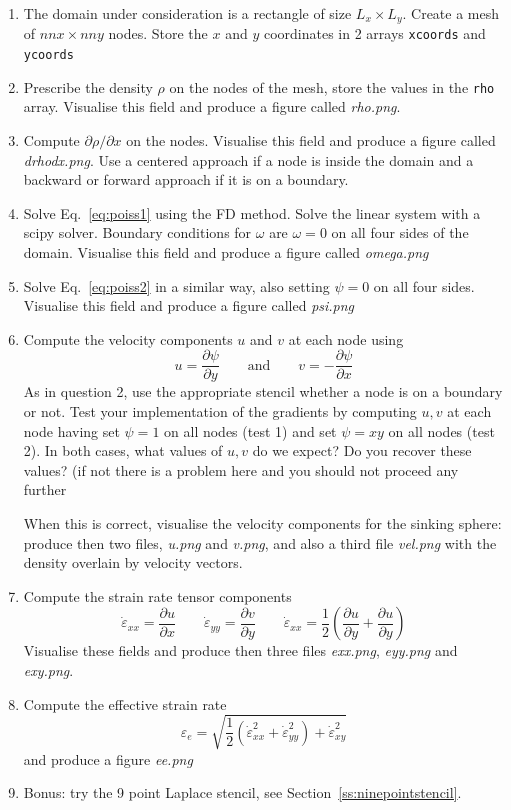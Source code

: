 \begin{enumerate}
\item The domain under consideration is a rectangle of size $L_x \times L_y$. Create a mesh of $nnx \times nny$ nodes. 
Store the $x$ and $y$ coordinates in 2 arrays {\tt xcoords} and {\tt ycoords}
\item Prescribe the density $\rho$ on the nodes of the mesh, store the values in the {\tt rho} array. 
Visualise this field and produce a figure called {\sl rho.png}.
\item Compute $\partial \rho/ \partial x$ on the nodes. Visualise this field and produce a figure called {\sl drhodx.png}. 
Use a centered approach if a node is inside the domain and a backward or forward approach if it is on a boundary.
\item Solve Eq.~\eqref{eq:poiss1} using the FD method. Solve the linear system with a scipy solver. Boundary conditions for $\omega$ are $\omega=0$ on all four sides of the domain.
Visualise this field and produce a figure called {\sl omega.png}
\item Solve Eq.~\eqref{eq:poiss2} in a similar way, also setting $\psi=0$ on all four sides.
Visualise this field and produce a figure called {\sl psi.png}
\item Compute the velocity components $u$ and $v$ at each node using 
\[
u=\frac{\partial \psi}{\partial y} 
\qquad \text{and} \qquad
v=-\frac{\partial \psi}{\partial x} 
\]
As in question 2, use the appropriate stencil whether a node is on a boundary or not.
Test your implementation of the gradients by computing $u,v$ at each node having set $\psi=1$ on all nodes
(test 1) and set $\psi=xy$ on all nodes (test 2). In both cases, what values of $u,v$ do we expect? 
Do you recover these values? (if not there is a problem here and you should not proceed any further 

When this is correct, visualise the velocity components for the sinking sphere: produce then 
two files, {\sl u.png} and {\sl v.png}, and also a third file {\sl vel.png} 
with the density overlain by velocity vectors.

\item Compute the strain rate tensor components
\[
\dot\varepsilon_{xx} =\frac{\partial u}{\partial x} 
\qquad
\dot\varepsilon_{yy} =\frac{\partial v}{\partial y} 
\qquad
\dot\varepsilon_{xx} = \frac12 \left(\frac{\partial u}{\partial y} 
+ \frac{\partial u}{\partial y} \right)
\]
Visualise these fields and produce then three files {\sl exx.png}, {\sl eyy.png} and {\sl exy.png}.

\item Compute the effective strain rate
\[
\varepsilon_e = \sqrt{ \frac{1}{2}(\dot\varepsilon_{xx}^2 + \dot\varepsilon_{yy}^2 ) + \dot\varepsilon_{xy}^2  }
\]
and produce a figure {\sl ee.png}

\item Bonus: try the 9 point Laplace stencil, see Section~\ref{ss:ninepointstencil}.

\end{enumerate}


